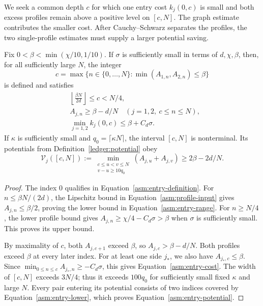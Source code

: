 We seek a common depth $c$ for which one entry cost $k_j(0,c)$ is small
and both excess profiles remain above a positive level on $[c,N]$.
The graph estimate contributes the smaller cost.  After
Cauchy--Schwarz separates the profiles, the two single-profile
estimates must supply a larger potential saving.

\begin{lemma}\label{asm:entry}
Fix $0<\beta<\min(\chi/10,1/10)$.  If $\sigma$ is sufficiently small
in terms of $d,\chi,\beta$, then, for all sufficiently large $N$, the
integer
\begin{equation}
 \label{asm:entry-definition}
 c=\max\{n\in\{0,\ldots,N\}:
                  \min(A_{1,n},A_{2,n})\le\beta\}
\end{equation}
is defined and satisfies
\begin{align}
 \label{asm:entry-range}
 &\left\lfloor\frac{\beta N}{2d}\right\rfloor\le c<N/4,\\
 \label{asm:entry-lower}
 &A_{j,n}\ge\beta-d/N
       \quad(j=1,2,\ c\le n\le N),\\
 \label{asm:entry-cost}
 &\min_{j=1,2} k_j(0,c)\le\beta+C_d\sigma.
\end{align}
If $\kappa$ is sufficiently small and $q_0=\lceil\kappa N\rceil$, the
interval $[c,N]$ is nonterminal.  Its potentials from
Definition~\ref{ledger:potential} obey
\begin{equation}
 \label{asm:entry-potential}
 \mathcal V_j([c,N])
 :=\min_{\substack{c\le u<v\le N\\v-u\ge10q_0}}
                         (A_{j,u}+A_{j,v})
 \ge2\beta-2d/N.
\end{equation}
\end{lemma}

\begin{proof}
The index $0$ qualifies in Equation~\eqref{asm:entry-definition}.
For $n\le\beta N/(2d)$, the Lipschitz bound in
Equation~\eqref{asm:profile-input} gives $A_{j,n}\le\beta/2$, proving
the lower bound in Equation~\eqref{asm:entry-range}.  For $n\ge N/4$,
the lower profile bound gives
$A_{j,n}\ge\chi/4-C_d\sigma>\beta$ when $\sigma$ is sufficiently
small.  This proves its upper bound.

By maximality of $c$, both $A_{j,c+1}$ exceed $\beta$, so
$A_{j,c}>\beta-d/N$.  Both profiles exceed $\beta$ at every later
index.  For at least one side $j_*$, we also have
$A_{j_*,c}\le\beta$.  Since
$\min_{0\le n\le c}A_{j_*,n}\ge-C_d\sigma$, this gives
Equation~\eqref{asm:entry-cost}.  The width of $[c,N]$ exceeds $3N/4$;
thus it exceeds $100q_0$ for sufficiently small fixed $\kappa$ and
large $N$.  Every pair entering its potential consists of two indices
covered by Equation~\eqref{asm:entry-lower}, which proves
Equation~\eqref{asm:entry-potential}.
\end{proof}

